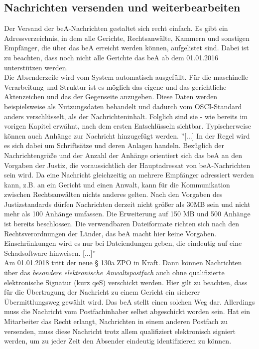 \subsection{Nachrichten versenden und weiterbearbeiten}
Der Versand der beA-Nachrichten gestaltet sich recht einfach. Es gibt ein Adressverzeichnis, in dem alle Gerichte, Rechtsanwälte, Kammern und sonstigen Empfänger, die über das beA erreicht werden können, aufgelistet sind. Dabei ist zu beachten, dass noch nicht alle Gerichte das beA ab dem 01.01.2016 unterstützen werden. \\
Die Absenderzeile wird vom System automatisch ausgefüllt. Für die maschinelle Verarbeitung und Struktur ist es möglich das eigene und das gerichtliche Aktenzeichen und das der Gegenseite anzugeben. Diese Daten werden beispielsweise als Nutzungsdaten behandelt und dadurch vom OSCI-Standard anders verschlüsselt, als der Nachrichteninhalt. Folglich sind sie - wie bereits im vorigen Kapitel erwähnt, nach dem ersten Entschlüsseln sichtbar. Typischerweise können auch Anhänge zur Nachricht hinzugefügt werden. ''[...] In der Regel wird es sich dabei um Schriftsätze und deren Anlagen handeln. Bezüglich der Nachrichtengröße und der Anzahl der Anhänge orientiert sich das beA an den Vorgaben der Justiz, die voraussichtlich der Hauptadressat von beA-Nachrichten sein wird. Da eine Nachricht gleichzeitig an mehrere Empfänger adressiert werden kann, z.B. an ein Gericht und einen Anwalt, kann für die Kommunikation zwischen Rechtsanwälten nichts anderes gelten. Nach den Vorgaben des Justizstandards dürfen Nachrichten derzeit nicht größer als 30MB sein und nicht mehr als 100 Anhänge umfassen. Die Erweiterung auf 150 MB und 500 Anhänge ist bereits beschlossen. Die verwendbaren Dateiformate richten sich nach den Rechtsverordnungen der Länder, das beA macht hier keine Vorgaben. Einschränkungen wird es nur bei Dateiendungen geben, die eindeutig auf eine Schadsoftware hinweisen. [...]'' \cite{bea:bea:brak3-2015} \\
Am 01.01.2018 tritt der neue § 130a ZPO \cite{bea:bea:zpo130} in Kraft. Dann können Nachrichten über das \textit{besondere elektronische Anwaltspostfach} auch ohne qualifizierte elektronische Signatur (kurz qeS) verschickt werden. Hier gilt zu beachten, dass für die Übertragung der Nachricht zu einem Gericht ein sicherer Übermittlungsweg gewählt wird. Das beA stellt einen solchen Weg dar. Allerdings muss die Nachricht vom Postfachinhaber selbst abgeschickt worden sein. Hat ein Mitarbeiter das Recht erlangt, Nachrichten in einem anderen Postfach zu versenden, muss diese Nachricht trotz allem qualifiziert elektronisch signiert werden, um zu jeder Zeit den Absender eindeutig identifizieren zu können. \\
